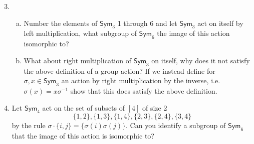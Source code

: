 \documentclass[12 pt]{article}
\newcommand{\Sym}{\mathsf{Sym}}
\begin{document}
\begin{enumerate}
\setcounter{enumi}{2}
\item 
\begin{enumerate}[(a)]\item Number the elements of $\Sym_3$ 1 through 6 and let $\Sym_3$ act on itself by left multiplication, what subgroup of $\Sym_6$ the image of this action isomorphic to? 

	\item What about right multiplication of $\Sym_3$ on itself, why does it not satisfy the above definition of a group action? If we instead define for $\sigma, x\in \Sym_3$ an action by right multiplication by the inverse, i.e. $\sigma(x)=x \sigma^{-1}$ show that this does satisfy the above definition.
\end{enumerate}
\item Let $\Sym_4 $ act on the set of subsets of $[4]$ of size 2
	\[
	\{1,2\}, \{1,3\}, \{1,4\},\{2,3\},\{2,4\},\{3,4\}
	\] by the rule $\sigma\cdot \{i,j\}=\{\sigma(i)\sigma(j)\}$. Can you identify a subgroup of $\Sym_6$ that the image of this action is isomorphic to?
\end{enumerate}
\newpage
\noindent {}
\end{document}
